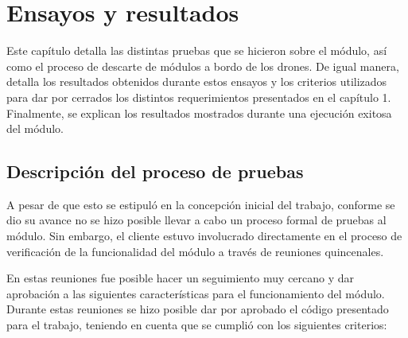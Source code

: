 
\chapter{Ensayos y resultados} %

\label{Chapter4} %

Este capítulo detalla las distintas pruebas que se hicieron sobre el módulo, así como el proceso de descarte de módulos a bordo de los drones. De igual manera, detalla los resultados obtenidos durante estos ensayos y los criterios utilizados para dar por cerrados los distintos requerimientos presentados en el capítulo 1. Finalmente, se explican los resultados mostrados durante una ejecución exitosa del módulo. 

\section{Descripción del proceso de pruebas}

A pesar de que esto se estipuló en la concepción inicial del trabajo, conforme se dio su avance no se hizo posible llevar a cabo un proceso formal de pruebas al módulo. Sin embargo, el cliente estuvo involucrado directamente en el proceso de verificación de la funcionalidad del módulo a través de reuniones quincenales.

En estas reuniones fue posible hacer un seguimiento muy cercano y dar aprobación a las siguientes características para el funcionamiento del módulo. Durante estas reuniones se hizo posible dar por aprobado el código presentado para el trabajo, teniendo en cuenta que se cumplió con los siguientes criterios:

